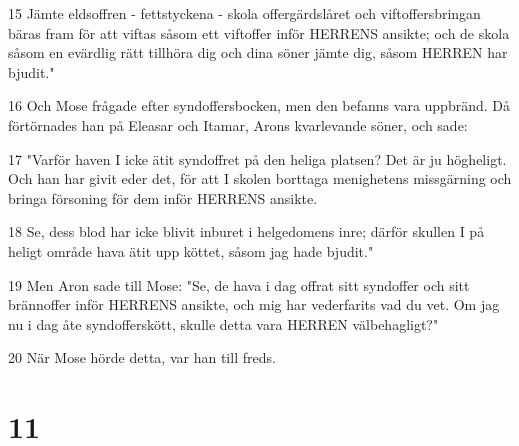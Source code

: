 \par 15 Jämte eldsoffren - fettstyckena - skola offergärdslåret och viftoffersbringan bäras fram för att viftas såsom ett viftoffer inför HERRENS ansikte; och de skola såsom en evärdlig rätt tillhöra dig och dina söner jämte dig, såsom HERREN har bjudit."
\par 16 Och Mose frågade efter syndoffersbocken, men den befanns vara uppbränd. Då förtörnades han på Eleasar och Itamar, Arons kvarlevande söner, och sade:
\par 17 "Varför haven I icke ätit syndoffret på den heliga platsen? Det är ju högheligt. Och han har givit eder det, för att I skolen borttaga menighetens missgärning och bringa försoning för dem inför HERRENS ansikte.
\par 18 Se, dess blod har icke blivit inburet i helgedomens inre; därför skullen I på heligt område hava ätit upp köttet, såsom jag hade bjudit."
\par 19 Men Aron sade till Mose: "Se, de hava i dag offrat sitt syndoffer och sitt brännoffer inför HERRENS ansikte, och mig har vederfarits vad du vet. Om jag nu i dag åte syndofferskött, skulle detta vara HERREN välbehagligt?"
\par 20 När Mose hörde detta, var han till freds.

\chapter{11}

